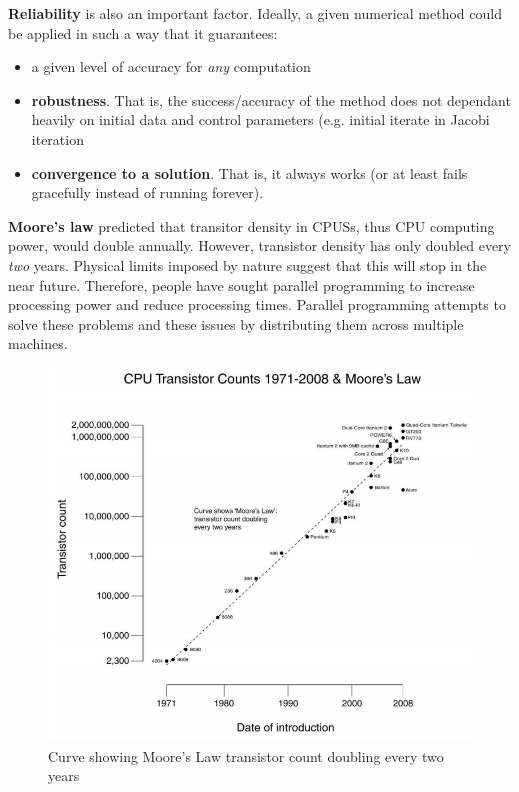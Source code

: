 \documentclass{article}
\begin{document}
\textbf{Reliability} is also an important factor. Ideally, a given numerical method could be applied in such a way that it guarantees:
\begin{itemize}
	\item a given level of accuracy for \textit{any} computation
	\item \textbf{robustness}. That is, the success/accuracy of the method does not dependant heavily on initial data and control parameters (e.g. initial iterate in Jacobi iteration
	\item \textbf{convergence to a solution}. That is, it always works (or at least fails gracefully instead of running forever).
\end{itemize}

\textbf{Moore's law} predicted that transitor density in CPUSs, thus CPU computing power, would double annually. However, transistor density has only doubled every \textit{two} years. Physical limits imposed by nature suggest that this will stop in the near future. Therefore, people have sought parallel programming to increase processing power and reduce processing times. Parallel programming attempts to solve these problems and these issues by distributing them across multiple machines.

\begin{figure}
	\centering
	\includegraphics[scale=0.5]{figures/moores-law.png}
	\caption{Curve showing Moore's Law transistor count doubling every two years}
	\label{fig:moores-law}
\end{figure}
\end{document}
